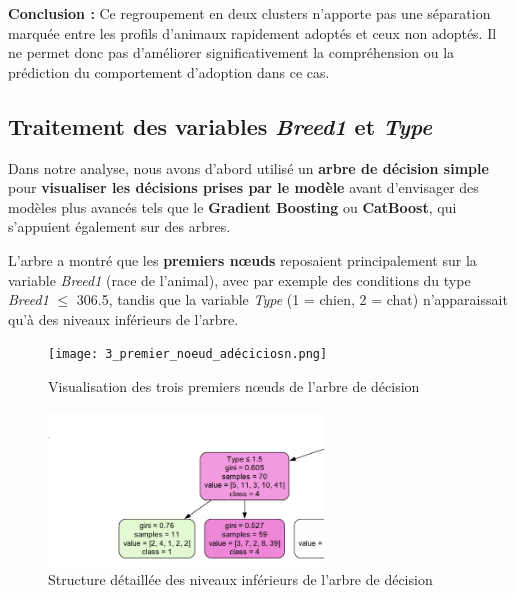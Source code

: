 \documentclass[a4paper,12pt]{article}
\begin{document}
\textbf{Conclusion :} Ce regroupement en deux clusters n'apporte pas une séparation marquée entre les profils d'animaux rapidement adoptés et ceux non adoptés. Il ne permet donc pas d'améliorer significativement la compréhension ou la prédiction du comportement d'adoption dans ce cas.



\subsection{Traitement des variables \textit{Breed1} et \textit{Type}}
 
Dans notre analyse, nous avons d'abord utilisé un \textbf{arbre de décision simple} pour \textbf{visualiser les décisions prises par le modèle} avant d'envisager des modèles plus avancés tels que le \textbf{Gradient Boosting} ou \textbf{CatBoost}, qui s'appuient également sur des arbres.
 
L'arbre a montré que les \textbf{premiers nœuds} reposaient principalement sur la variable \textit{Breed1} (race de l'animal), avec par exemple des conditions du type \textit{Breed1} $\leq$ 306.5, tandis que la variable \textit{Type} (1 = chien, 2 = chat) n'apparaissait qu'à des niveaux inférieurs de l'arbre.
 
\begin{figure}[H]

    \centering

    \texttt{[image: 3\_premier\_noeud\_adéciciosn.png]}

    \caption{Visualisation des trois premiers nœuds de l'arbre de décision}

    \label{fig:catboost12_conf}

\end{figure}
 
\begin{figure}[H]

    \centering

    \includegraphics[width=0.65\textwidth]{plus bas dans arbre de decision.png}

    \caption{Structure détaillée des niveaux inférieurs de l'arbre de décision}

    \label{fig:catboost12_conf}

\end{figure}
 
\end{document}
